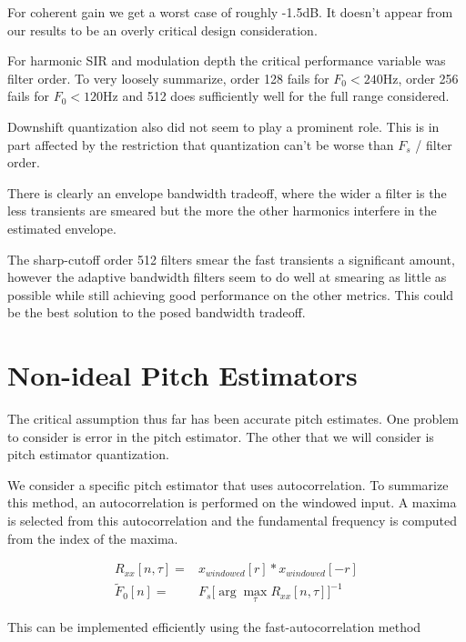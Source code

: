 \documentclass [11pt, proquest] {uwthesis}[2015/03/03]
\begin{document}
For coherent gain we get a worst case of roughly -1.5dB.  It doesn't appear from our results to be an overly critical design consideration.

For harmonic SIR and modulation depth the critical performance variable was filter order.  To very loosely summarize, order 128 fails for $F_0 < 240$Hz, order 256 fails for $F_0 < 120$Hz and 512 does sufficiently well for the full range considered.

Downshift quantization also did not seem to play a prominent role.  This is in part affected by the restriction that quantization can't be worse than $F_s$ / filter order.

There is clearly an envelope bandwidth tradeoff, where the wider a filter is the less transients are smeared but the more the other harmonics interfere in the estimated envelope.

The sharp-cutoff order 512 filters smear the fast transients a significant amount, however the adaptive bandwidth filters seem to do well at smearing as little as possible while still achieving good performance on the other metrics.  This could be the best solution to the posed bandwidth tradeoff.


\section{Non-ideal Pitch Estimators}

The critical assumption thus far has been accurate pitch estimates.  One problem to consider is error in the pitch estimator.  The other that we will consider is pitch estimator quantization.

We consider a specific pitch estimator that uses autocorrelation.  To summarize this method, an autocorrelation is performed on the windowed input.  A maxima is selected from this autocorrelation and the fundamental frequency is computed from the index of the maxima.

\begin{align}
R_{xx}[n,\tau] =& x_{windowed}[r] * x_{windowed}[-r] \\
\tilde{F}_0[n] =& F_s \Bigg[ \arg\max_\tau R_{xx}[n,\tau] \Bigg]^{-1}
\end{align}

This can be implemented efficiently using the fast-autocorrelation method
\end{document}

